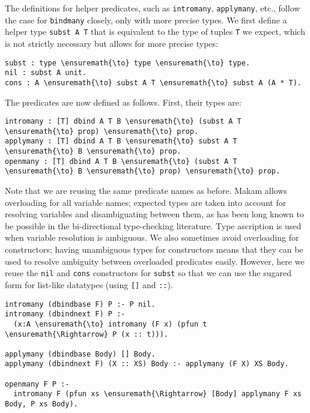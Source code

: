 The definitions for helper predicates, such as \texttt{intromany},
\texttt{applymany}, etc., follow the case for \texttt{bindmany} closely,
only with more precise types. We first define a helper type
\texttt{subst\ A\ T} that is equivalent to the type of tuples \texttt{T}
we expect, which is not strictly necessary but allows for more precise
types:

\begin{verbatim}
subst : type \ensuremath{\to} type \ensuremath{\to} type.
nil : subst A unit.
cons : A \ensuremath{\to} subst A T \ensuremath{\to} subst A (A * T).
\end{verbatim}

The predicates are now defined as follows. First, their types are:

\begin{verbatim}
intromany : [T] dbind A T B \ensuremath{\to} (subst A T \ensuremath{\to} prop) \ensuremath{\to} prop.
applymany : [T] dbind A T B \ensuremath{\to} subst A T \ensuremath{\to} B \ensuremath{\to} prop.
openmany : [T] dbind A T B \ensuremath{\to} (subst A T \ensuremath{\to} B \ensuremath{\to} prop) \ensuremath{\to} prop.
\end{verbatim}

Note that we are reusing the same predicate names as before. Makam
allows overloading for all variable names; expected types are taken into
account for resolving variables and disambiguating between them, as has
been long known to be possible in the bi-directional type-checking
literature. Type ascription is used when variable resolution is
ambiguous. We also sometimes avoid overloading for constructors; having
unambiguous types for constructors means that they can be used to
resolve ambiguity between overloaded predicates easily. However, here we
reuse the \texttt{nil} and \texttt{cons} constructors for \texttt{subst}
so that we can use the sugared form for list-like datatypes (using
\texttt{{[}{]}} and \texttt{::}).

\begin{verbatim}
intromany (dbindbase F) P :- P nil.
intromany (dbindnext F) P :-
  (x:A \ensuremath{\to} intromany (F x) (pfun t \ensuremath{\Rightarrow} P (x :: t))).

applymany (dbindbase Body) [] Body.
applymany (dbindnext F) (X :: XS) Body :- applymany (F X) XS Body.

openmany F P :-
  intromany F (pfun xs \ensuremath{\Rightarrow} [Body] applymany F xs Body, P xs Body).
\end{verbatim}

